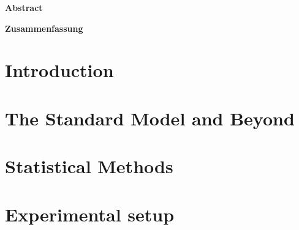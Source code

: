 \documentclass[a4paper, 11pt, twoside, openany]{ThesisStyle}
\begin{document}
\begin{titlepage}

\end{titlepage}

\newpage\thispagestyle{empty}\mbox{}
\newpage\thispagestyle{empty}\mbox{}

\vspace*{\fill}
\begin{center}
\Large
{\color{MidnightBlue}\textbf{Abstract}}

\end{center}
\vspace*{\fill}


\newpage\thispagestyle{empty}\mbox{}
\newpage\thispagestyle{empty}\mbox{}

\vspace*{\fill}
\begin{center}
\Large
{\color{MidnightBlue}\textbf{Zusammenfassung}}
\end{center}

\vspace*{\fill}

\newpage\thispagestyle{empty}\mbox{}
\normalsize
\tableofcontents

\newpage
{}

\chapter*{Introduction}
\label{ch:Introduction}


\chapter{The Standard Model and Beyond} %
\label{ch:theory}
\vspace*{\fill}\newpage

\vspace*{\fill}\newpage

\chapter{Statistical Methods} %
\label{ch:statmet}
\vspace*{\fill}\newpage

\vspace*{\fill}\newpage


\chapter{Experimental setup}
\label{ch:CMS}
\vspace*{\fill}\newpage

\end{document}
